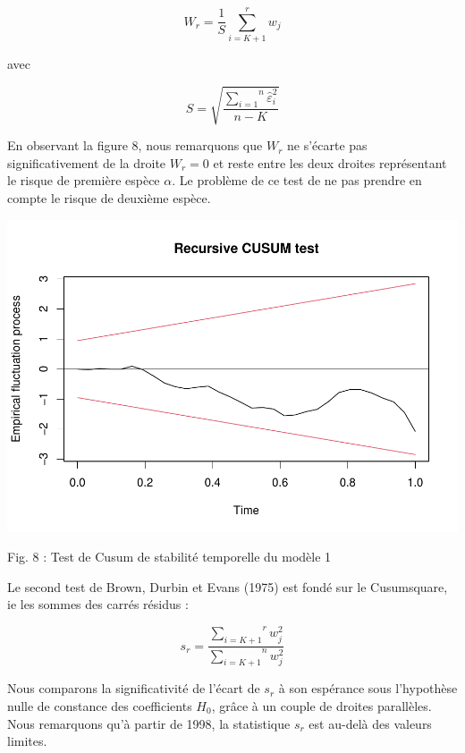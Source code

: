 \documentclass[
]{article}
\begin{document}
\begin{equation}    
\label{eq:wr}    
W_r = \frac{1}{S} \overset{r}{\underset{i=K+1}{\sum}} w_j
\end{equation}

avec

\begin{equation}
\label{eq:S}

S = \sqrt{\frac{\overset{n}{\underset{i=1}{\sum}} \hat{\varepsilon}_i^2}{n - K}}
\end{equation}

En observant la figure 8, nous remarquons que \(W_r\) ne s'écarte pas
significativement de la droite \(W_r = 0\) et reste entre les deux
droites représentant le risque de première espèce \(\alpha\). Le
problème de ce test de ne pas prendre en compte le risque de deuxième
espèce.

\begin{center}\includegraphics[width=0.7\linewidth,height=0.7\textheight]{Projet_econometrie_II_files/figure-latex/unnamed-chunk-7-1} \end{center}

Fig. 8 : Test de Cusum de stabilité temporelle du modèle 1

Le second test de Brown, Durbin et Evans (1975) est fondé sur le
Cusumsquare, ie les sommes des carrés résidus :

\begin{equation}
\label{eq:sr}
s_r = \frac{\overset{r}{\underset{i=K+1}{\sum}} w_j^2}{\overset{n}{\underset{i=K+1}{\sum}} w_j^2}
\end{equation}

Nous comparons la significativité de l'écart de \(s_r\) à son espérance
sous l'hypothèse nulle de constance des coefficients \(H_0\), grâce à un
couple de droites parallèles. Nous remarquons qu'à partir de 1998, la
statistique \(s_r\) est au-delà des valeurs limites.
\end{document}
